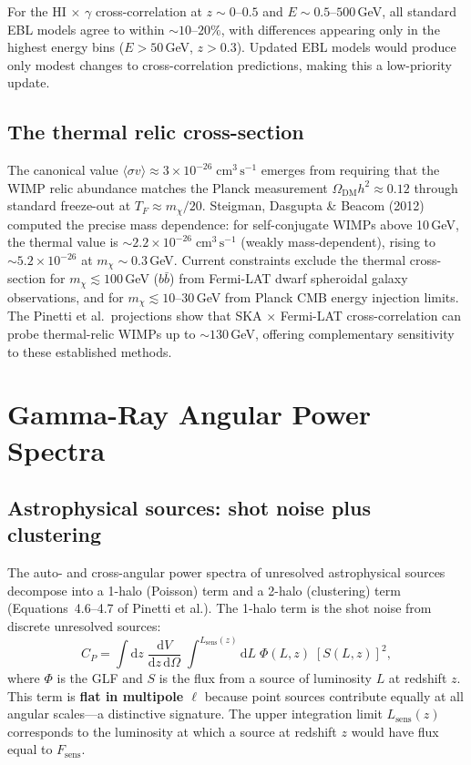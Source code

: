 \documentclass[10pt,a4paper]{article}
\newcommand{\sigv}{\langle\sigma v\rangle}
\newcommand{\mchi}{m_\chi}
\newcommand{\OmDM}{\Omega_{\mathrm{DM}}}
\newcommand{\Fsens}{F_{\mathrm{sens}}}
\begin{document}
For the HI$\,\times\,\gamma$ cross-correlation at $z \sim 0$--$0.5$ and $E \sim 0.5$--$500$\,GeV, all standard EBL models agree to within $\sim10$--$20\%$, with differences appearing only in the highest energy bins ($E > 50$\,GeV, $z > 0.3$). Updated EBL models would produce only modest changes to cross-correlation predictions, making this a low-priority update.

\subsection{The thermal relic cross-section}

The canonical value $\sigv \approx 3 \times 10^{-26}\;\mathrm{cm^3\,s^{-1}}$ emerges from requiring that the WIMP relic abundance matches the Planck measurement $\OmDM h^2 \approx 0.12$ through standard freeze-out at $T_F \approx \mchi/20$. Steigman, Dasgupta \& Beacom (2012) computed the precise mass dependence: for self-conjugate WIMPs above 10\,GeV, the thermal value is $\sim2.2 \times 10^{-26}\;\mathrm{cm^3\,s^{-1}}$ (weakly mass-dependent), rising to $\sim5.2 \times 10^{-26}$ at $\mchi \sim 0.3$\,GeV. Current constraints exclude the thermal cross-section for $\mchi \lesssim 100$\,GeV ($b\bar{b}$) from Fermi-LAT dwarf spheroidal galaxy observations, and for $\mchi \lesssim 10$--$30$\,GeV from Planck CMB energy injection limits. The Pinetti et al.\ projections show that SKA$\,\times\,$Fermi-LAT cross-correlation can probe thermal-relic WIMPs up to $\sim130$\,GeV, offering complementary sensitivity to these established methods.


\section{Gamma-Ray Angular Power Spectra}
\label{sec:power_spectra}

\subsection{Astrophysical sources: shot noise plus clustering}

The auto- and cross-angular power spectra of unresolved astrophysical sources decompose into a 1-halo (Poisson) term and a 2-halo (clustering) term (Equations~4.6--4.7 of Pinetti et al.). The 1-halo term is the shot noise from discrete unresolved sources:
\begin{equation}
\label{eq:CP}
    C_P = \int \mathrm{d}z\;\frac{\mathrm{d}V}{\mathrm{d}z\,\mathrm{d}\Omega}\;\int^{L_{\mathrm{sens}}(z)} \mathrm{d}L\;\Phi(L,z)\;\left[S(L,z)\right]^2,
\end{equation}
where $\Phi$ is the GLF and $S$ is the flux from a source of luminosity $L$ at redshift $z$. This term is \textbf{flat in multipole $\ell$} because point sources contribute equally at all angular scales---a distinctive signature. The upper integration limit $L_{\mathrm{sens}}(z)$ corresponds to the luminosity at which a source at redshift $z$ would have flux equal to $\Fsens$.
\end{document}
